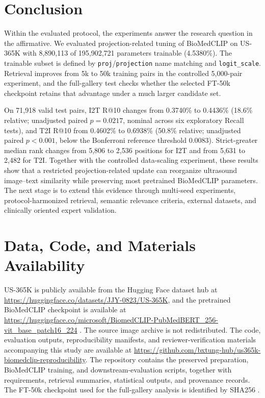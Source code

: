 \documentclass[runningheads]{llncs}
\begin{document}
\section{Conclusion}

Within the evaluated protocol, the experiments answer the research question in the affirmative. We evaluated projection-related tuning of BioMedCLIP on US-365K with 8,890,113 of 195,902,721 parameters trainable (4.5380\%). The trainable subset is defined by \texttt{proj}/\texttt{projection} name matching and \texttt{logit\_scale}. Retrieval improves from 5k to 50k training pairs in the controlled 5,000-pair experiment, and the full-gallery test checks whether the selected FT-50k checkpoint retains that advantage under a much larger candidate set.

On 71,918 valid test pairs, I2T R@10 changes from 0.3740\% to 0.4436\% (18.6\% relative; unadjusted paired $p=0.0217$, nominal across six exploratory Recall tests), and T2I R@10 from 0.4602\% to 0.6938\% (50.8\% relative; unadjusted paired $p<0.001$, below the Bonferroni reference threshold $0.0083$). Strict-greater median rank changes from 5,806 to 2,536 positions for I2T and from 5,631 to 2,482 for T2I. Together with the controlled data-scaling experiment, these results show that a restricted projection-related update can reorganize ultrasound image--text similarity while preserving most pretrained BioMedCLIP parameters. The next stage is to extend this evidence through multi-seed experiments, protocol-harmonized retrieval, semantic relevance criteria, external datasets, and clinically oriented expert validation.

\section*{Data, Code, and Materials Availability}

US-365K is publicly available from the Hugging Face dataset hub at \url{https://huggingface.co/datasets/JJY-0823/US-365K}, and the pretrained BioMedCLIP checkpoint is available at \url{https://huggingface.co/microsoft/BiomedCLIP-PubMedBERT_256-vit_base_patch16_224} \cite{zhang2023biomedclip}. The source image archive is not redistributed. The code, evaluation outputs, reproducibility manifests, and reviewer-verification materials accompanying this study are available at \url{https://github.com/bxtung-hub/us365k-biomedclip-reproducibility}. The repository contains the preserved preparation, BioMedCLIP training, and downstream-evaluation scripts, together with requirements, retrieval summaries, statistical outputs, and provenance records. The FT-50k checkpoint used for the full-gallery analysis is identified by SHA256 \texttt{}.
\end{document}
